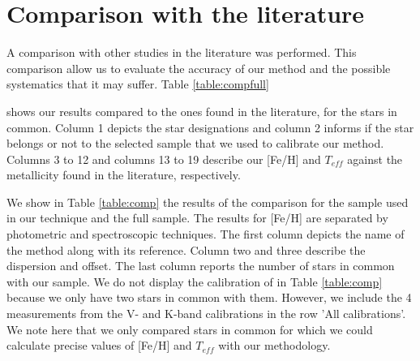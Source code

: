 \documentclass[referee]{aa}
\begin{document}
\section{Comparison with the literature}
\label{sec:comp}
A comparison with other studies in the literature was performed. This comparison allow us to evaluate the accuracy of our method and the possible systematics that it may suffer. Table \ref{table:compfull} \addtocounter{table}{1} shows our results compared to the ones found in the literature, for the stars in common. Column 1 depicts the star designations and column 2 informs if the star belongs or not to the selected sample that we used to calibrate our method. Columns 3 to 12 and columns 13 to 19 describe our [Fe/H] and $T_{eff}$ against the metallicity found in the literature, respectively. 

We show in Table \ref{table:comp} the results of the comparison for the sample used in our technique and the full sample. The results for [Fe/H] are separated by photometric and spectroscopic techniques. The first column depicts the name of the method along with its reference. Column two and three describe the dispersion and offset. The last column reports the number of stars in common with our sample. We do not display the calibration of \citet{Mann-2013a} in Table \ref{table:comp} because we only have two stars in common with them. However, we include the 4 measurements from the V- and K-band calibrations in the row 'All calibrations'. We note here that we only compared stars in common for which we could calculate precise values of [Fe/H] and $T_{eff}$ with our methodology.
\end{document}
